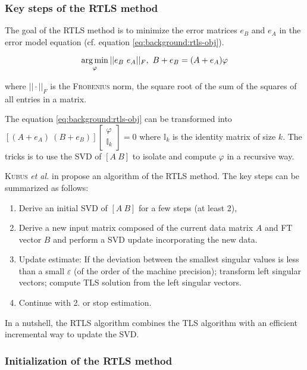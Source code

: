 \documentclass[/home/francois/latex/report/main.tex]{subfiles}
\begin{document}
\subsubsection{Key steps of the \ac{RTLS} method}

The goal of the \ac{RTLS} method is to minimize the error matrices $e_B$ and $e_A$ in the error model equation (cf. equation \ref{eq:background:rtls-obj}).

\begin{equation}
  \label{eq:background:rtls-obj}
  \operatorname*{arg\,min}_{\varphi} ||e_B \ e_A||_F, \ B + e_B = (A + e_A) \varphi
\end{equation}

where $|| \cdot ||_F$ is the \textsc{Frobenius} norm, the square root of the sum of the squares of all entries in a matrix.

The equation \ref{eq:background:rtls-obj} can be transformed into $[(A + e_A) \ (B + e_B)]\begin{bmatrix}\varphi \\ \mathbb{I}_k\end{bmatrix} = 0$ where $\mathbb{I}_k$ is the identity matrix of size $k$. The tricks is to use the \ac{SVD} of $[A \ B]$ to isolate and compute $\varphi$ in a recursive way.

\textsc{Kubus} \textit{et al.} in \cite{Kubus2008} propose an algorithm of the \ac{RTLS} method. The key steps can be summarized as follows:

\begin{enumerate}
  \item Derive an initial \ac{SVD} of $[A \ B]$ for a few steps (at least 2),
  \item Derive a new input matrix composed of the current data matrix $A$ and \ac{FT} vector $B$ and perform a \ac{SVD} update incorporating the new data.
  \item Update estimate: If the deviation between the smallest singular values is less than a small $\varepsilon$ (of the order of the machine precision); transform left singular vectors; compute \ac{TLS} solution from the left singular vectors.
  \item Continue with 2. or stop estimation.
\end{enumerate}

In a nutshell, the \ac{RTLS} algorithm combines the \ac{TLS} algorithm with an efficient incremental way to update the \ac{SVD}.

\subsubsection{Initialization of the \ac{RTLS} method}
\end{document}

